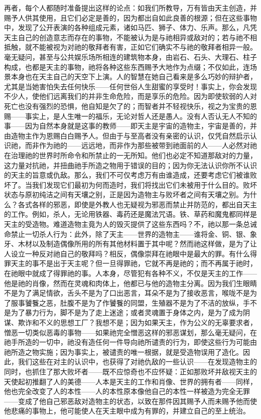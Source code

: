 再者，每个人都随时准备提出这样的论点：如我们所教导，万有皆由天主创造，并赐予人供其使用，且它们必定是善的，因为都出自如此良善的根源；但在这些事物中，发现了公开表演的各种组成元素，诸如马匹、狮子、体力、乐声。那么，凡凭天主自己的创造意志而存在的事物，不能被认为是与祂相异或敌对的；若与祂不相抵触，就不能被视为对祂的敬拜者有害，正如它们确实不与祂的敬拜者相异一般。毫无疑问，甚至与公共娱乐场所相连的建筑物本身，由岩石、石头、大理石、柱子构成，也都是天主的事物，祂将各种这些东西赐予大地作为点缀；不仅如此，连场景本身也在天主自己的天空下上演。人的智慧在她自己看来是多么巧妙的辩护者，尤其是当她害怕失去任何快乐——任何世俗人生甜蜜的享受时！事实上，你会发现不少人，使他们远离我们的并非生命危险，而是享乐的危险。因为即使软弱的人对死亡也没有强烈的恐惧，他自知是欠了的；而智者并不轻视快乐，视之为宝贵的恩赐——事实上，是人生唯一的福乐，无论对哲人还是愚人。没有人否认无人不知的事——因为自然本身就是这事的教师——即天主是宇宙的造物主，宇宙是善的，并由造物主作为恩赐白白赐予人。但由于与至高者没有亲密的认识，仅凭自然启示认识祂，而非作为祂的——远远地，而非作为那些被带到祂面前的人——人必然对祂在治理祂的世界时所命令和所禁止的一无所知。他们也必定不知道那敌对的力量，这力量对抗祂，并扭曲祂手所造之物用于错误的目的；因为你无法认识你所不认识的天主的旨意或仇敌。那么，我们不可仅考虑万有由谁造成，还要考虑它们被谁败坏了。当我们发现它们最初为何而造时，我们将找出它们未被用于什么目的。败坏状态与原初纯洁之间有天壤之别，正是因为造物主与败坏者之间有天壤之别。为什么？各式各样的邪恶，即使是外教人也无疑视为邪恶而禁止并防范的，都出自天主的工作。例如，杀人，无论用铁器、毒药还是魔法咒语。铁、草药和魔鬼都同样是天主的受造物。难道造物主竟为人的毁灭提供了这些东西吗？不，祂以那一条总诫命禁止一切杀人行为：此外，除了天主——世界的造物主——谁将金、铜、银、象牙、木材以及制造偶像所用的所有其他材料置于其中呢？然而祂这样做，是为了让人设立一种反对祂自己的敬拜吗？相反，偶像崇拜在祂眼中是最大的罪。有什么得罪天主的事不是出于天主呢？但一旦得罪祂，它就不再是祂的；而不再属于祂时，在祂眼中就成了得罪祂的事。人本身，尽管犯有各种不义，不仅是天主的工作——他是祂的肖像，然而在灵魂和肉体上，他都已与他的造物主分离。因为我们生眼睛不是为了满足情欲，舌头不是为了口出恶言，耳朵不是为了接收恶言，喉咙不是为了服事饕餮之恶，肚腹不是为了作饕餮的同盟，生殖器不是为了不洁的放纵，手不是为了暴力行为，脚不是为了走上迷途；或者灵魂置于身体之内，是为了成为阴谋、欺诈和不义的思想工厂？我想不是；因为如果天主，作为公义的无辜要求者，憎恶一切类似恶毒的事物——如果祂完全憎恶这样的邪恶谋划，那么毫无疑问，在祂手所造的一切中，祂没有造任何一件导向祂所谴责的行为，即使这些行为可能由祂所造之物实施；因为事实上，被谴责的唯一根据，就是受造物误用了造化。因此，我们这些在对主的认识中，也获得了对祂仇敌的一些认识——在发现造物主的同时，也抓住了那大败坏者——既不应惊奇也不应怀疑：正如那败坏并敌视天主的天使起初推翻了人的美德——人本是天主的工作和肖像、世界的拥有者——同样，他也完全改变了人的本性——人的本性原本像他自己的本性一样被造为完全无罪——变成了他自己邪恶敌对造物主的状态，以致在那件因其赐予人而未赐予他而使他悲痛的事物上，他可能使人在天主眼中成为有罪的，并建立自己的至上统治。\par

